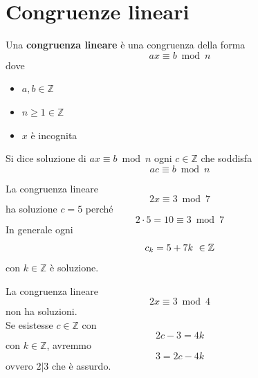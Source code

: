 \documentclass[a4paper,12pt, oneside]{book}
\begin{document}
\section{Congruenze lineari}
\begin{definizione}
	Una \textbf{congruenza lineare} è una congruenza della forma $$ax \equiv b \bmod n$$ dove \begin{itemize}
		\item $a,b \in \mathbb{Z}$
		\item $n \geq 1 \in \mathbb{Z}$
		\item $x$ è incognita
	\end{itemize}
	Si dice soluzione di $ax \equiv b \bmod n$ ogni $c \in \mathbb{Z}$ che soddisfa $$ac \equiv b \bmod n$$
\end{definizione}
\begin{shaded}
	\begin{esempio}
		La congruenza lineare $$2x \equiv 3 \bmod 7$$ ha soluzione $c=5$ perché $$2 \cdot 5 = 10 \equiv 3 \bmod 7$$
		In generale ogni $$c_k = 5+7k \mbox{\space} \in \mathbb{Z}$$ con $k \in \mathbb{Z}$ è soluzione.
	\end{esempio}
	\begin{esempio}
		La congruenza lineare $$2x \equiv 3 \bmod 4$$ non ha soluzioni.\\
		Se esistesse $c \in \mathbb{Z}$ con $$2c-3=4k$$ con $k \in \mathbb{Z}$, avremmo $$3 = 2c-4k$$ ovvero $2|3$ che è assurdo.
	\end{esempio}
\end{shaded}
\end{document}

